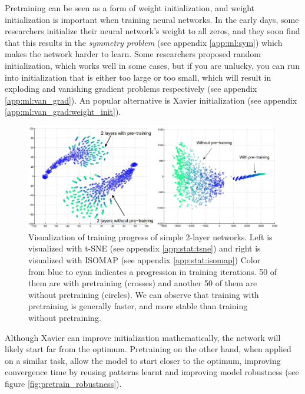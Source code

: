 Pretraining can be seen as a form of weight initialization, and weight initialization is important when training neural networks. In the early days, some researchers initialize their neural network's weight to all zeros, and they soon find that this results in the \textit{symmetry problem} (see appendix \ref{app:ml:sym}) which makes the network harder to learn. Some researchers proposed random initialization, which works well in some cases, but if you are unlucky, you can run into initialization that is either too large or too small, which will result in exploding and vanishing gradient problems respectively (see appendix \ref{app:ml:van_grad}). An popular alternative is Xavier initialization\cite{glorotUnderstandingDifficultyTraining2010} (see appendix \ref{app:ml:van_grad:weight_init}).


\begin{figure}
    \centering
    \includegraphics[width=1\textwidth]{images/introduction/pretrain_vis.jpg}
    \caption{Visualization of training progress of simple 2-layer networks. Left is visualized with t-SNE (see appendix \ref{app:stat:tsne}) and right is visualized with ISOMAP (see appendix \ref{app:stat:isomap}) Color from blue to cyan indicates a progression in training iterations. 50 of them are with pretraining (crosses) and another 50 of them are without pretraining (circles). We can observe that training with pretraining is generally faster, and more stable than training without pretraining.\cite{erhanWhyDoesUnsupervised}} 
    \label{fig:pretrain_tsne}
\end{figure}

Although Xavier can improve initialization mathematically, the network will likely start far from the optimum. Pretraining on the other hand, when applied on a similar task, allow the model to start closer to the optimum, improving convergence time by reusing patterns learnt and improving model robustness\cite{hendrycksUsingPreTrainingCan2019} (see figure \ref{fig:pretrain_robustness}).


